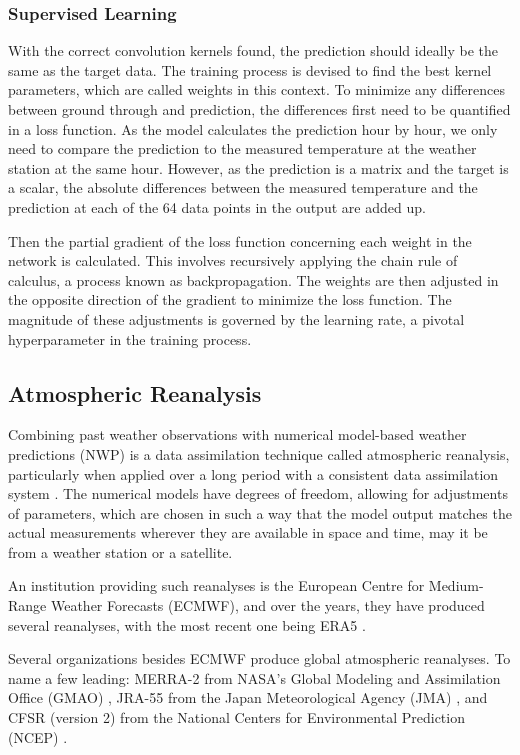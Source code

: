 \subsubsection*{Supervised Learning}

With the correct convolution kernels found, the prediction should ideally be the same as the target data.
The training process is devised to find the best kernel parameters, which are called weights in this context.
To minimize any differences between ground through and prediction, the differences first need to be quantified in a loss function.
As the model calculates the prediction hour by hour, we only need to compare the prediction to the measured temperature at the weather station at the same hour.
However, as the prediction is a matrix and the target is a scalar, the absolute differences between the measured temperature and the prediction at each of the 64 data points in the output are added up. 

Then the partial gradient of the loss function concerning each weight in the network is calculated.
This involves recursively applying the chain rule of calculus, a process known as backpropagation. The weights are then adjusted in the opposite direction of the gradient to minimize the loss function.
The magnitude of these adjustments is governed by the learning rate, a pivotal hyperparameter in the training process. 

\subsection{Atmospheric Reanalysis}
 
Combining past weather observations with numerical model-based weather predictions (NWP)
is a data assimilation technique called atmospheric reanalysis, particularly when applied over a long period with a consistent data assimilation system \cite{Poli2016ERA20C, ECMWF2020dataassimilation}. The numerical models have degrees of freedom, allowing for adjustments of parameters, which are chosen in such a way that the model output matches the actual measurements wherever they are available in space and time, may it be from a weather station or a satellite.

An institution providing such reanalyses is the European Centre for Medium-Range Weather Forecasts (ECMWF), and over the years, they have produced several reanalyses, with the most recent one being ERA5 \cite{Hersbach2020ERA5quality}.

Several organizations besides ECMWF produce global atmospheric reanalyses. To name a few leading: MERRA-2 from NASA's Global Modeling and Assimilation Office (GMAO) \cite{Gelaro2017}, JRA-55 from the Japan Meteorological Agency (JMA) \cite{Kobayashi2015}, and CFSR (version 2) from the National Centers for Environmental Prediction (NCEP) \cite{Saha2014}.

